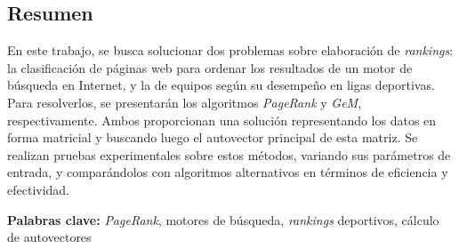 \documentclass[11pt, a4paper, spanish]{article}
\let\strong\textbf
\theoremstyle{plain}
\theoremstyle{remark}
\begin{document}


\maketitle
\newpage

\begin{addmargin}[4em]{4em}

\section*{\centering Resumen}

En este trabajo, se busca solucionar dos problemas sobre elaboración de \emph{rankings}: la clasificación de páginas web para ordenar los resultados de un motor de búsqueda en Internet, y la de equipos según su desempeño en ligas deportivas. Para resolverlos, se presentarán los algoritmos \emph{PageRank} y \emph{GeM}, respectivamente. Ambos proporcionan una solución representando los datos en forma matricial y buscando luego el autovector principal de esta matriz. Se realizan pruebas experimentales sobre estos métodos, variando sus parámetros de entrada, y comparándolos con algoritmos alternativos en términos de eficiencia y efectividad.

\vspace{4em}
\noindent \strong{Palabras clave:} \emph{PageRank}, motores de búsqueda, \emph{rankings} deportivos, cálculo de autovectores

\end{addmargin}
\clearpage

\tableofcontents
\clearpage


\clearpage

\clearpage

\clearpage

\clearpage

\begin{appendices}
    
    \clearpage
\end{appendices}
\clearpage

\printbibliography[heading=bibintoc]
\end{document}
